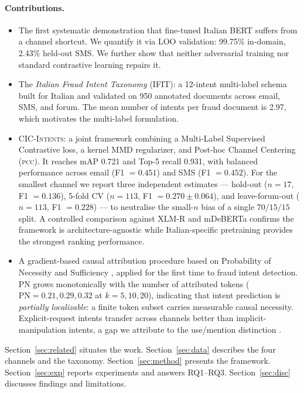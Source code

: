 \documentclass[preprint,12pt,authoryear]{elsarticle}
\newcommand{\pcc}{\textsc{pcc}}
\begin{document}
\paragraph*{Contributions.}
\begin{itemize}
\item[\textbf{C1.}] The first systematic demonstration that
fine-tuned Italian BERT suffers from a channel shortcut. We quantify
it via LOO validation: 99.75\% in-domain, 2.43\% held-out SMS. We
further show that neither adversarial training nor standard
contrastive learning repairs it.

\item[\textbf{C2.}] The \emph{Italian Fraud Intent Taxonomy} (IFIT):
a 12-intent multi-label schema built for Italian and validated on 950
annotated documents across email, SMS, and forum. The mean number of
intents per fraud document is 2.97, which motivates the multi-label
formulation.

\item[\textbf{C3.}] \textsc{CIC-Intents}: a joint framework combining
a Multi-Label Supervised Contrastive loss, a kernel MMD regularizer,
and Post-hoc Channel Centering (\pcc). It reaches mAP 0.721 and
Top-5 recall 0.931, with balanced performance across email
(F1 $=0.451$) and SMS (F1 $=0.452$). For the smallest channel we
report three independent estimates --- hold-out ($n=17$, F1
$=0.136$), 5-fold CV ($n=113$, F1 $=0.270\pm0.064$), and
leave-forum-out ($n=113$, F1 $=0.228$) --- to neutralise the
small-$n$ bias of a single $70/15/15$ split. A controlled comparison
against XLM-R and mDeBERTa confirms the framework is
architecture-agnostic while Italian-specific pretraining provides
the strongest ranking performance.

\item[\textbf{C4.}] A gradient-based causal attribution procedure
based on Probability of Necessity and Sufficiency
\citep{pearl2009causality}, applied for the first time to fraud intent
detection. PN grows monotonically with the number of attributed
tokens ($\text{PN}=0.21,0.29,0.32$ at $k=5,10,20$), indicating that
intent prediction is \emph{partially localizable}: a finite token
subset carries measurable causal necessity. Explicit-request intents
transfer across channels better than implicit-manipulation intents, a
gap we attribute to the use/mention distinction
\citep{gligoric2024use}.
\end{itemize}

Section~\ref{sec:related} situates the work.
Section~\ref{sec:data} describes the four channels and the taxonomy.
Section~\ref{sec:method} presents the framework.
Section~\ref{sec:exp} reports experiments and answers RQ1--RQ3.
Section~\ref{sec:disc} discusses findings and limitations.
\end{document}

